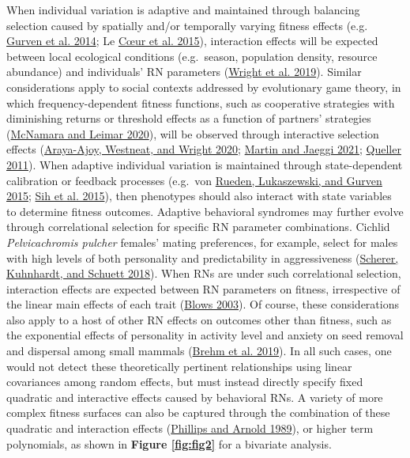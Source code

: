\documentclass{article}
\begin{document}
When individual variation is adaptive and maintained through balancing
selection caused by spatially and/or temporally varying fitness effects
(e.g. \protect\hyperlink{ref-Gurven2014}{Gurven et al. 2014}; Le
\protect\hyperlink{ref-LC2015}{Cœur et al. 2015}), interaction effects
will be expected between local ecological conditions (e.g.~season,
population density, resource abundance) and individuals' RN parameters
(\protect\hyperlink{ref-Wright2019}{Wright et al. 2019}). Similar
considerations apply to social contexts addressed by evolutionary game
theory, in which frequency-dependent fitness functions, such as
cooperative strategies with diminishing returns or threshold effects as
a function of partners' strategies
(\protect\hyperlink{ref-McNamara2020}{McNamara and Leimar 2020}), will
be observed through interactive selection effects
(\protect\hyperlink{ref-Araya2020}{Araya-Ajoy, Westneat, and Wright
2020}; \protect\hyperlink{ref-Martin2021}{Martin and Jaeggi 2021};
\protect\hyperlink{ref-Queller2011}{Queller 2011}). When adaptive
individual variation is maintained through state-dependent calibration
or feedback processes (e.g.~von
\protect\hyperlink{ref-Rueden2015}{Rueden, Lukaszewski, and Gurven
2015}; \protect\hyperlink{ref-Sih2015}{Sih et al. 2015}), then
phenotypes should also interact with state variables to determine
fitness outcomes. Adaptive behavioral syndromes may further evolve
through correlational selection for specific RN parameter combinations.
Cichlid \emph{Pelvicachromis pulcher} females' mating preferences, for
example, select for males with high levels of both personality and
predictability in aggressiveness
(\protect\hyperlink{ref-Scherer2018}{Scherer, Kuhnhardt, and Schuett
2018}). When RNs are under such correlational selection, interaction
effects are expected between RN parameters on fitness, irrespective of
the linear main effects of each trait
(\protect\hyperlink{ref-Blows2003}{Blows 2003}). Of course, these
considerations also apply to a host of other RN effects on outcomes
other than fitness, such as the exponential effects of personality in
activity level and anxiety on seed removal and dispersal among small
mammals (\protect\hyperlink{ref-Brehm2019}{Brehm et al. 2019}). In all
such cases, one would not detect these theoretically pertinent
relationships using linear covariances among random effects, but must
instead directly specify fixed quadratic and interactive effects caused
by behavioral RNs. A variety of more complex fitness surfaces can also
be captured through the combination of these quadratic and interaction
effects (\protect\hyperlink{ref-Phillips1989}{Phillips and Arnold
1989}), or higher term polynomials, as shown in \textbf{Figure
\ref{fig:fig2}} for a bivariate analysis.
\end{document}
